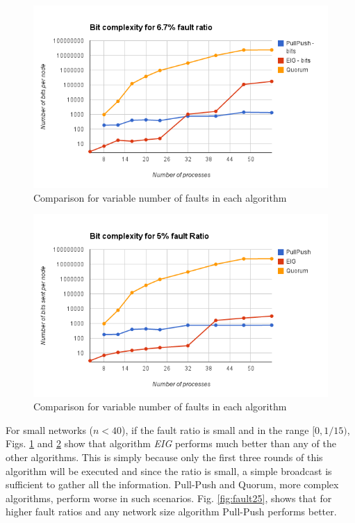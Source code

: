 \begin{figure}[h]
 \centering
\includegraphics[scale=0.4]{Fault667}
\caption{ Comparison for variable number of faults in each algorithm}
 \label{fig:fault667}
\end{figure}

\begin{figure}[h]
 \centering
\includegraphics[scale=0.4]{Fault5}
\caption{ Comparison for variable number of faults in each algorithm}
 \label{fig:fault5}
\end{figure}

For small networks ($n < 40$), if the fault ratio is small and in the range $[0, 1/15)$, Figs. \ref{fig:fault667} and \ref{fig:fault5} show that algorithm \textit{EIG} performs much better than any of the other algorithms. This is simply because only the first three rounds of this algorithm will be executed and since the ratio is small, a simple broadcast is sufficient to gather all the information. Pull-Push and Quorum, more complex algorithms, perform worse in such scenarios. Fig. \ref{fig:fault25}, shows that for higher fault ratios and any network size algorithm Pull-Push performs better.

